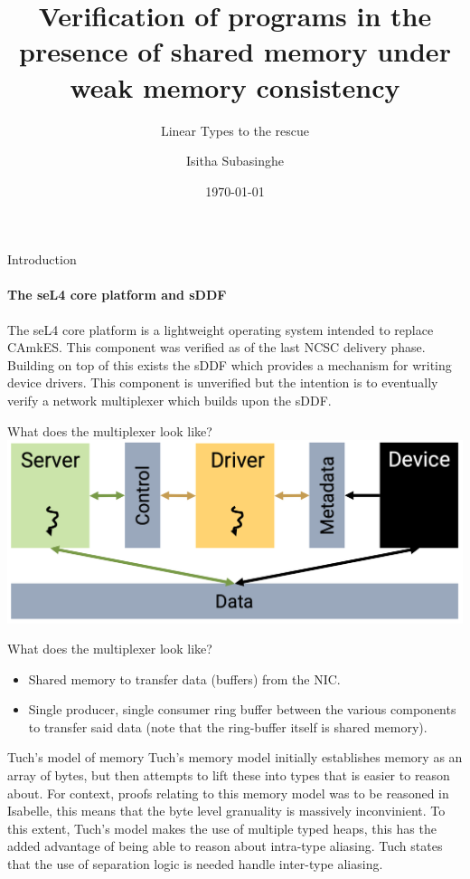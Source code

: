 \documentclass[aspectratio=169]{beamer}
\author{Isitha Subasinghe}
\title{Verification of programs in the presence of shared memory under weak memory consistency}
\subtitle{Linear Types to the rescue}
\institute{School of Computer Science and Engineering}
\date{\today}
\begin{document}
	\begin{frame}[plain]
		\titlepage
	\end{frame}
	
	\begin{frame}{Introduction}
    \framesubtitle{The seL4 core platform and sDDF}  
    The seL4 core platform is a lightweight operating system intended to replace CAmkES.
    This component was verified as of the last NCSC delivery phase. 
    \\ \vspace{20pt}
    Building on top of this exists the sDDF which provides a mechanism for writing device drivers. This component is unverified but the intention is to eventually verify a network multiplexer which builds upon the sDDF. 
	\end{frame}

  \begin{frame}{What does the multiplexer look like?}
    \includegraphics[width=\textwidth]{sddf_arch} 
  \end{frame}

  \begin{frame}{What does the multiplexer look like?}
    \begin{itemize}
      \item Shared memory to transfer data (buffers) from the NIC.
      \item Single producer, single consumer ring buffer between the various components to transfer said data (note that the ring-buffer itself is shared memory).
    \end{itemize}
  \end{frame}

  \begin{frame}{Tuch's model of memory}
    Tuch's memory model initially establishes memory as an array of bytes, but then attempts to lift these into 
    types that is easier to reason about. For context, proofs relating to this memory model was to be reasoned in Isabelle, this means that the 
    byte level granuality is massively inconvinient. To this extent, Tuch's model makes the use of multiple typed heaps, this has the added advantage of being 
    able to reason about intra-type aliasing. Tuch states that the use of separation logic is needed handle inter-type aliasing. 
  \end{frame}
\end{document}
